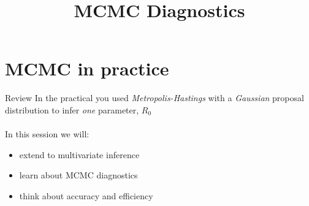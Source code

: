 \documentclass[compress]{beamer}
\title{MCMC Diagnostics}
\date{}
\begin{document}
    \begin{frame}
        \titlepage
    \end{frame}

\section{MCMC in practice}
\label{sec-8}
\begin{frame}[label=sec-8-1]{Review}
    In the practical you used \textit{Metropolis-Hastings} with a \textit{Gaussian} proposal distribution to infer \textit{one} parameter, $R_0$\\~\\

    In this session we will:
    \begin{itemize}
        \item extend to multivariate inference
        \item learn about MCMC diagnostics
        \item think about accuracy and efficiency
    \end{itemize}
\end{frame}
\end{document}
